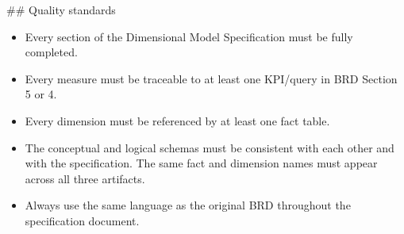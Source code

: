 \bigskip
\#\# Quality standards
\begin{itemize}
    \item Every section of the Dimensional Model Specification must be fully completed.
    \item Every measure must be traceable to at least one KPI/query in BRD Section 5 or 4.
    \item Every dimension must be referenced by at least one fact table.
    \item The conceptual and logical schemas must be consistent with each other and with the specification. The same fact and dimension names must appear across all three artifacts.
    \item Always use the same language as the original BRD throughout the specification document.
\end{itemize}
